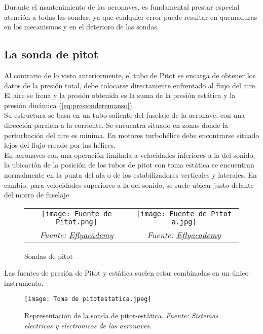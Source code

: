 Durante el mantenimiento de las aeronaves, es fundamental prestar especial atención a todas las sondas, ya que cualquier error puede resultar en quemaduras en los mecanismos y en el deterioro de las sondas.

\subsection{La sonda de pitot}

Al contrario de lo visto anteriormente, el tubo de Pitot se encarga de obtener los datos de la presión total, debe colocarse directamente enfrentado al flujo del aire. El aire se frena y la presión obtenida es la suma de la presión estática y la presión dinámica (\ref{eq:presionderemanso}).\\

Su estructura se basa en un tubo saliente del fuselaje de la aeronave, con una dirección paralela a la corriente. Se encuentra situado en zonas donde la perturbación del aire es mínima. En motores turbohélice debe encontrarse situado lejos del flujo creado por las hélices.\\

En aeronaves con una operación limitada a velocidades inferiores a la del sonido, la ubicación de la posición de los tubos de pitot con toma estática se encuentran normalmente en la punta del ala o de los estabilizadores verticales y laterales. En cambio, para velocidades superiores a la del sonido, se suele ubicar justo delante del morro de fuselaje

\begin{figure}[H]
    \centering
    \begin{tabular}{c c}  %
        \texttt{[image: Fuente de Pitot.png]} & 
        \texttt{[image: Fuente de Pitot a.jpg]} \\
        \textit{Fuente: \href{https://www.eflyacademy.com/single-post/sistema-pitot-statico}{Eflyacademy}} & \textit{Fuente: \href{https://www.eflyacademy.com/single-post/qué-es-y-cómo-funciona-el-sistema-de-tubo-pitot-y-presión-estática}{Eflyacademy}}
    \end{tabular}
    \caption{Sondas de pitot}
\end{figure}

Las fuentes de presión de Pitot y estática suelen estar combinadas en un único instrumento.
\begin{figure}[H] 
    \centering
    \texttt{[image: Toma de pitotestatica.jpeg]}
    \caption{\centering Representación de la sonda de pitot-estática. \textit{Fuente: Sistemas electricos y electronicos de las aeronaves.}}
    \label{fig:placeholder1}
\end{figure}

